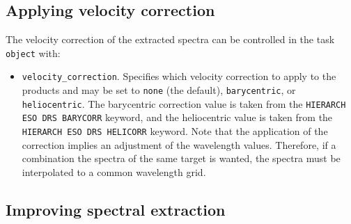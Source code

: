 \subsection{Applying velocity correction}

The velocity correction of the extracted spectra can be controlled in the task {\tt object} with:
\begin{itemize}
    \item {\tt velocity\_correction}. Specifies which velocity correction to apply to the products
    and may be set to {\tt none} (the default), {\tt barycentric}, or {\tt heliocentric}.
    The barycentric correction
    value is taken from the {\tt HIERARCH ESO DRS BARYCORR} keyword, and the heliocentric
    value is taken from the {\tt HIERARCH ESO DRS HELICORR} keyword. Note that the 
    application of the correction implies an adjustment of the wavelength values. 
    Therefore, if a combination the spectra of the same target is wanted,
    the spectra must be interpolated to a common wavelength grid.
\end{itemize}

\subsection{Improving spectral extraction}


